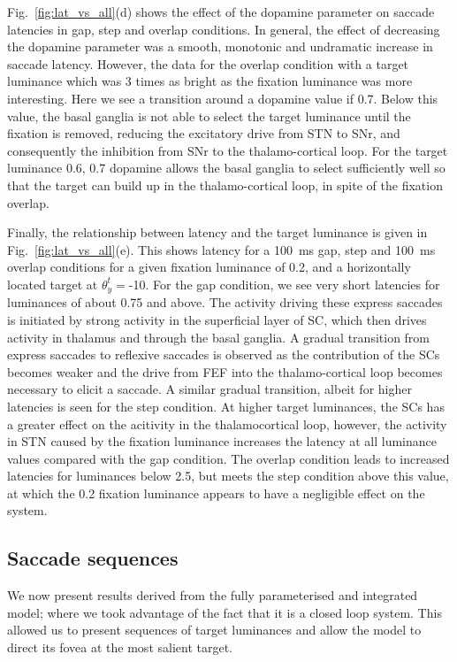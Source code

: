\documentclass{frontiersSCNS}
\begin{document}
Fig.~\ref{fig:lat_vs_all}(d) shows the effect of the dopamine parameter on
saccade latencies in gap, step and overlap conditions. In general, the effect of
decreasing the dopamine parameter was a smooth, monotonic and undramatic
increase in saccade latency. However, the data for the overlap condition
with a target luminance which was 3 times as bright as the fixation luminance
was more interesting. Here we see a transition around a dopamine value if 0.7.
Below this value,
the basal ganglia is not able to select the target luminance until the fixation
is removed, reducing the excitatory drive from STN to SNr, and consequently
the inhibition from SNr to the thalamo-cortical loop. For the target
luminance 0.6, 0.7 dopamine allows the basal ganglia to select sufficiently well
so that the target can build up in the thalamo-cortical loop, in spite of
the fixation overlap.

Finally, the relationship between latency and the target luminance is given in
Fig.~\ref{fig:lat_vs_all}(e). This shows latency for a 100~ms gap, step and
100~ms overlap conditions for a given fixation luminance of 0.2,
and a horizontally located target at $\theta_{y}^{t}=$-10\dg. For the
gap condition, we see very short latencies for luminances of about 0.75 and above.
The activity driving these express saccades is initiated by strong activity
in the superficial layer of SC, which then drives activity in thalamus and
through the basal ganglia. A gradual transition from express saccades to
reflexive saccades is observed as the contribution of the SCs becomes weaker
and the drive from FEF into the thalamo-cortical loop becomes necessary
to elicit a saccade.
%
A similar gradual transition, albeit for higher latencies
is seen for the step condition. At higher target luminances, the SCs has a
greater effect on the acitivity in the thalamocortical loop, however, the
activity in STN caused by the fixation luminance increases the latency at
all luminance values compared with the gap condition.
%
The overlap condition leads to increased latencies for luminances below 2.5, but
meets the step condition above this value, at which the 0.2 fixation
luminance appears to have a negligible effect on the system.

\subsection{Saccade sequences}

We now present results derived from the fully parameterised and integrated
model; where we took advantage of the fact that it is a closed loop system. This
allowed us to present sequences of target luminances and allow the model to
direct its fovea at the most salient target.
\end{document}
